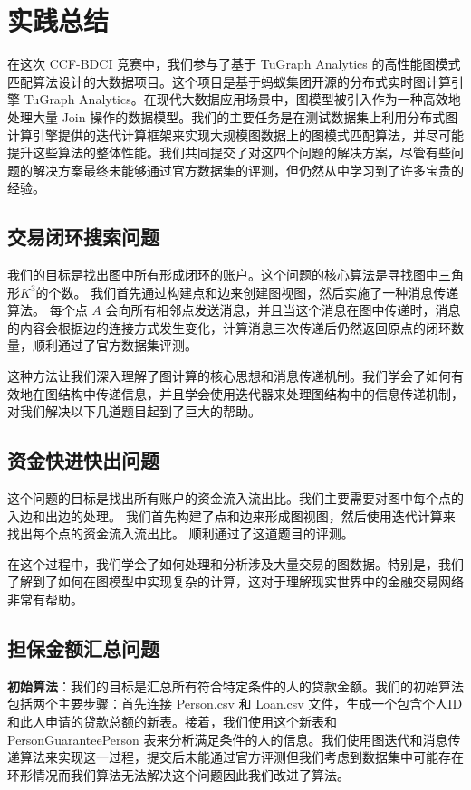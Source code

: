 \section{实践总结}
在这次 CCF-BDCI 竞赛中，我们参与了基于 TuGraph Analytics 的高性能图模式匹配算法设计的大数据项目。这个项目是基于蚂蚁集团开源的分布式实时图计算引擎 TuGraph Analytics。在现代大数据应用场景中，图模型被引入作为一种高效地处理大量 Join 操作的数据模型。我们的主要任务是在测试数据集上利用分布式图计算引擎提供的迭代计算框架来实现大规模图数据上的图模式匹配算法，并尽可能提升这些算法的整体性能。我们共同提交了对这四个问题的解决方案，尽管有些问题的解决方案最终未能够通过官方数据集的评测，但仍然从中学习到了许多宝贵的经验。

\subsection{交易闭环搜索问题}
我们的目标是找出图中所有形成闭环的账户。这个问题的核心算法是寻找图中三角形$ K^3 $的个数。
我们首先通过构建点和边来创建图视图，然后实施了一种消息传递算法。
每个点 $ A $ 会向所有相邻点发送消息，并且当这个消息在图中传递时，消息的内容会根据边的连接方式发生变化，计算消息三次传递后仍然返回原点的闭环数量，顺利通过了官方数据集评测。

这种方法让我们深入理解了图计算的核心思想和消息传递机制。我们学会了如何有效地在图结构中传递信息，并且学会使用迭代器来处理图结构中的信息传递机制，对我们解决以下几道题目起到了巨大的帮助。

\subsection{资金快进快出问题}
这个问题的目标是找出所有账户的资金流入流出比。我们主要需要对图中每个点的入边和出边的处理。
我们首先构建了点和边来形成图视图，然后使用迭代计算来找出每个点的资金流入流出比。
顺利通过了这道题目的评测。

在这个过程中，我们学会了如何处理和分析涉及大量交易的图数据。特别是，我们了解到了如何在图模型中实现复杂的计算，这对于理解现实世界中的金融交易网络非常有帮助。

\subsection{担保金额汇总问题}
\textbf{初始算法}：我们的目标是汇总所有符合特定条件的人的贷款金额。我们的初始算法包括两个主要步骤：首先连接 Person.csv 和 Loan.csv 文件，生成一个包含个人ID和此人申请的贷款总额的新表。接着，我们使用这个新表和 PersonGuaranteePerson 表来分析满足条件的人的信息。我们使用图迭代和消息传递算法来实现这一过程，提交后未能通过官方评测但我们考虑到数据集中可能存在环形情况而我们算法无法解决这个问题因此我们改进了算法。

